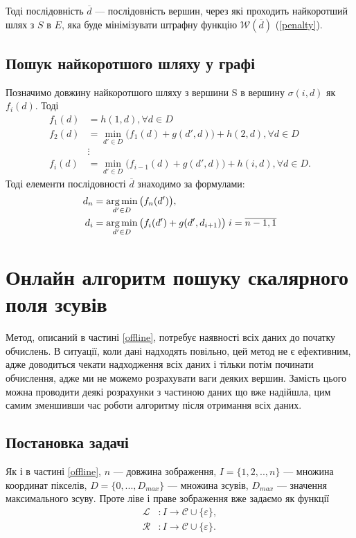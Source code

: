 Тоді послідовність $\overline{d}$ --- послідовність вершин, через які проходить найкоротший шлях з $S$ в $E$, яка буде мінімізувати штрафну функцію $ \mathcal{W}(\overline{d}) $ (\ref{penalty}).


\subsection{Пошук найкоротшого шляху у графі}
Позначимо довжину найкоротшого шляху з вершини S в вершину $ \sigma(i, d) $ як $ f_i (d) $. 
Тоді 
\begin{align*}
	f_1 (d) &= h(1, d),  \forall d \in D \\
	f_2 (d) &=  \min\limits_{d' \in D}\Big( f_1(d) + g(d', d) \Big) + h(2, d),  \forall d \in D \\
	&\vdots \\
	f_i (d) &= \min\limits_{d' \in D}\Big( f_{i-1}(d) + g(d', d) \Big) + h(i, d),  \forall d \in D .
\end{align*}
Тоді елементи послідовності $\overline{d}$ знаходимо за формулами:
\begin{align*}
d_n &= \operatorname*{arg\,min}\limits_{d' \in D}{\big( f_n(d') \big)}, \\
d_i &= \operatorname*{arg\,min}\limits_{d' \in D}{\big( f_{i}(d') + g(d',d_{i+1})\big) \; i = \overline{n-1, 1}}
\end{align*}
\newpage



\section{Онлайн алгоритм пошуку скалярного поля зсувів}
Метод, описаний в частині \ref{offline}, потребує наявності всіх даних до початку обчислень. В ситуації, коли дані надходять повільно, цей метод не є ефективним, адже доводиться чекати надходження всіх даних і тільки потім починати обчислення, адже ми не можемо розрахувати ваги деяких вершин.
Замість цього можна проводити деякі розрахунки з частиною даних що вже надійшла, цим самим зменшивши час роботи алгоритму після отримання всіх даних.

\subsection{Постановка задачі}
Як і в частині \ref{offline}, $n$ --- довжина зображення, $I = \{1, 2, .., n\}$ --- множина координат пікселів, $D = \{0, ... , D_{max}\}$ --- множина зсувів, $D_{max}$ --- значення максимального зсуву. 
Проте ліве і праве зображення вже задаємо як функції 
\begin{align*}
	\mathcal{L} &: I \rightarrow \mathcal{C} \cup \{ \varepsilon \}, \\
	\mathcal{R} &: I \rightarrow \mathcal{C} \cup \{ \varepsilon \}.
\end{align*}

